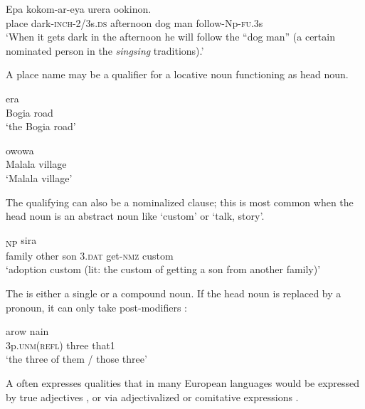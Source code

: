\ea%
\label{ex:4:x1832}
\gll Epa  kokom-ar-eya  urera     ookinon. \\
    place  dark-\textsc{inch}-2/3s.\textsc{ds}  afternoon  dog  man  follow-Np-\textsc{fu}.3s  \\
\glt`When it gets dark in the afternoon he will follow the ``dog man'' (a certain nominated person in the \textit{singsing} traditions).'
\z

A place name may be a qualifier for a locative noun functioning as head noun. 

\ea%
\label{ex:4:x834}
\gll {}  era \\
     Bogia  road \\
\glt`the Bogia road'
\z

\ea%
\label{ex:4:x833}
\gll {}  owowa \\
  Malala  village    \\
\glt`Malala village'
\z

The qualifying  can also be a nominalized clause; this is most common when the head noun is an abstract noun like  `custom' or  `talk, story'.

\ea%
\label{ex:4:x414}
\textsubscript{NP}  sira \\
    family  other  son  3.\textsc{dat}  get-\textsc{nmz}  custom  \\
\glt`adoption custom (lit: the custom of getting a son from another family)'
\z

The  is either a single or a compound noun.  If the head noun is replaced by a pronoun, it can only take post-modifiers :

\ea%
\label{ex:4:x415}
\gll {}  arow  nain  \\
   3p.\textsc{unm}(\textsc{refl})  three  that1   \\
\glt`the three of them / those three'
\z

A  often expresses qualities that in many European languages would be expressed by true adjectives , or via adjectivalized  or comitative expressions .

